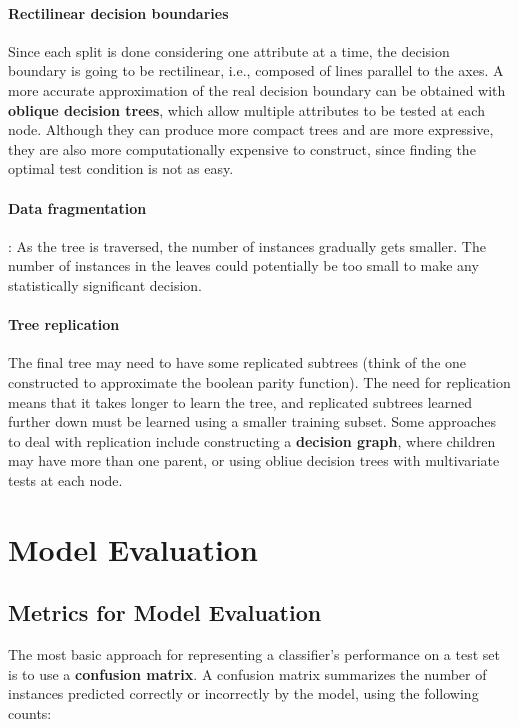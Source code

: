\paragraph{Rectilinear decision boundaries}
Since each split is done considering one attribute at a time, the decision boundary is going to be rectilinear, i.e., composed of lines parallel to the axes. A more accurate approximation of the real decision boundary can be obtained with \textbf{oblique decision trees}, which allow multiple attributes to be tested at each node. Although they can produce more compact trees and are more expressive, they are also more computationally expensive to construct, since finding the optimal test condition is not as easy.

\paragraph{Data fragmentation}:
As the tree is traversed, the number of instances gradually gets smaller. The number of instances in the leaves could potentially be too small to make any statistically significant decision.

\paragraph{Tree replication}
The final tree may need to have some replicated subtrees (think of the one constructed to approximate the boolean parity function). The need for replication means that it takes longer to learn the tree, and replicated subtrees learned further down must be learned using a smaller training subset. Some approaches to deal with replication include constructing a \textbf{decision graph}, where children may have more than one parent, or using obliue decision trees with multivariate tests at each node.

\section{Model Evaluation}
\subsection{Metrics for Model Evaluation}

The most basic approach for representing a classifier's performance on a test set is to use a \textbf{confusion matrix}. A confusion matrix summarizes the number of instances predicted correctly or incorrectly by the model, using the following counts:


